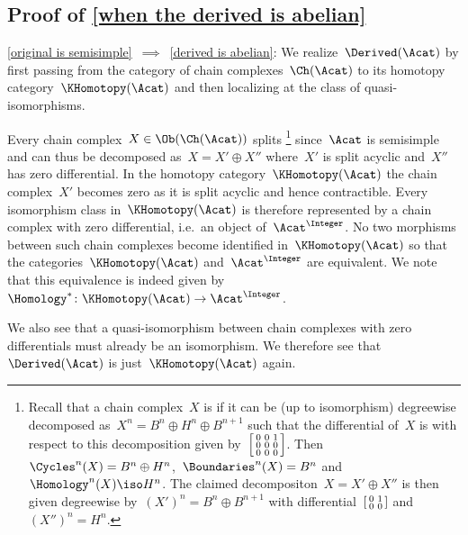 \documentclass[a4paper,10pt]{scrartcl}
\begin{document}
\subsection{Proof of \cref{when the derived is abelian}}
\label{when the derived is abelian proof}

\begin{implicationslist}
\item[\ref{original is semisimple}~$\implies$~\ref{derived is abelian}:]
  We realize~$\Derived(\Acat)$ by first passing from the category of chain complexes~$\Ch(\Acat)$ to its homotopy category~$\KHomotopy(\Acat)$ and then localizing at the class of quasi-isomorphisms.
  
  Every chain complex~$X \in \Ob(\Ch(\Acat))$ splits%
  \footnote{Recall that a chain complex~$X$ is  if it can be (up to isomorphism) degreewise decomposed as~$X^n = B^n \oplus H^n \oplus B^{n+1}$ such that the differential of~$X$ is with respect to this decomposition given by~$\begin{bsmallmatrix} 0 & 0 & 1 \\ 0 & 0 & 0 \\ 0 & 0 & 0 \end{bsmallmatrix}$.
  Then~$\Cycles^n(X) = B^n \oplus H^n$,~$\Boundaries^n(X) = B^n$ and~$\Homology^n(X) \iso H^n$.
  The claimed decompositon~$X = X' \oplus X''$ is then given degreewise by~$(X')^n = B^n \oplus B^{n+1}$ with differential~$\begin{bsmallmatrix} 0 & 1 \\ 0 & 0 \end{bsmallmatrix}$ and~$(X'')^n = H^n$.}
  since~$\Acat$ is semisimple and can thus be decomposed as~$X = X' \oplus X''$ where~$X'$ is split acyclic and~$X''$ has zero differential.
  In the homotopy category~$\KHomotopy(\Acat)$ the chain complex~$X'$ becomes zero as it is split acyclic and hence contractible.
  Every isomorphism class in~$\KHomotopy(\Acat)$ is therefore represented by a chain complex with zero differential, i.e.\ an object of~$\Acat^\Integer$.
  No two morphisms between such chain complexes become identified in~$\KHomotopy(\Acat)$ so that the categories~$\KHomotopy(\Acat)$ and~$\Acat^\Integer$ are equivalent.
  We note that this equivalence is indeed given by~$\Homology^* \colon \KHomotopy(\Acat) \to \Acat^\Integer$.
  
  We also see that a quasi-isomorphism between chain complexes with zero differentials must already be an isomorphism.
  We therefore see that~$\Derived(\Acat)$ is just~$\KHomotopy(\Acat)$ again.
  

\end{implicationslist}
\end{document}
